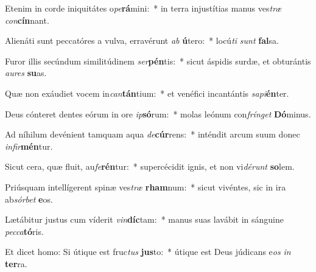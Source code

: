\item Etenim in corde iniquitátes o\textit{pe}\textbf{rá}mini:~* in terra injustítias manus ves\textit{træ} \textit{con}\textbf{cín}nant.
\item Alienáti sunt peccatóres a vulva, erravérunt \textit{ab} \textbf{ú}tero:~* locú\textit{ti} \textit{sunt} \textbf{fal}sa.
\item Furor illis secúndum similitúdinem \textit{ser}\textbf{pén}tis:~* sicut áspidis surdæ, et obturántis \textit{au}\textit{res} \textbf{su}as.
\item Quæ non exáudiet vocem in\textit{can}\textbf{tán}tium:~* et venéfici incantántis \textit{sa}\textit{pi}\textbf{én}ter.
\item Deus cónteret dentes eórum in ore \textit{ip}\textbf{só}rum:~* molas leónum con\textit{frín}\textit{get} \textbf{Dó}minus.
\item Ad níhilum devénient tamquam aqua \textit{de}\textbf{cúr}rens:~* inténdit arcum suum donec \textit{in}\textit{fir}\textbf{mén}tur.
\item Sicut cera, quæ fluit, au\textit{fe}\textbf{rén}tur:~* supercécidit ignis, et non vi\textit{dé}\textit{runt} \textbf{so}lem.
\item Priúsquam intellígerent spinæ ves\textit{træ} \textbf{rham}num:~* sicut vivéntes, sic in ira ab\textit{sór}\textit{bet} \textbf{e}os.
\item Lætábitur justus cum víderit \textit{vin}\textbf{díc}tam:~* manus suas lavábit in sánguine \textit{pec}\textit{ca}\textbf{tó}ris.
\item Et dicet homo: Si útique est fruc\textit{tus} \textbf{jus}to:~* útique est Deus júdicans e\textit{os} \textit{in} \textbf{ter}ra.
